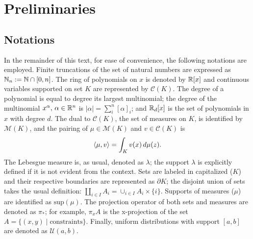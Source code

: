 \section{Preliminaries}
\label{sec:preliminaries}
  \subsection{Notations}
  In the remainder of this text, for ease of convenience, the following notations are employed. Finite truncations of the set of natural numbers are expressed as \mbox{$\mathbb{N}_n:=\mathbb{N}\cap [0,n]$}. The ring of polynomials on $x$ is denoted by $\mathbb{R}[x]$ and continuous variables supported on set $K$ are represented by $\mathcal C(K)$. The degree of a polynomial is equal to degree its largest multinomial; the degree of the multinomial $x^\alpha,\,\alpha\in \mathbb{R}^n$ is $|\alpha|=\sum_{i}^n[\alpha]_i$; and $\mathbb{R}_d[x]$ is the set of polynomials in $x$ with degree $d$. The dual to $\mathcal C(K)$, the set of measures on $K$, is identified by $\mathcal M(K)$, and the pairing of $\mu\in \mathcal M(K)$ and $v\in \mathcal C(K)$ is
  $$\left\langle \mu,v\right\rangle=\int_{K}v(x)\,d\mu(z).$$
  The Lebesgue measure is, as usual, denoted as $\lambda$; the support $\lambda$ is explicitly defined if it is not evident from the context. Sets are labeled in capitalized ($K$) and their respective boundaries are represented as $\partial K$; the disjoint union of sets takes the usual definition: $\coprod_{i\in I}A_i=\cup_{i\in I}A_i\times \{i\}$. Supports of measures ($\mu$) are identified as $\text{sup}(\mu)$. The projection operator of both sets and measures are denoted as $\pi_{*}$; for example, $\pi_{x}A$ is the x-projection of the set $A=\{(x,y)\mid \text{constraints}\}$. Finally, uniform distributions with support $[a,b]$ are denoted as $\mathcal U(a,b)$.
